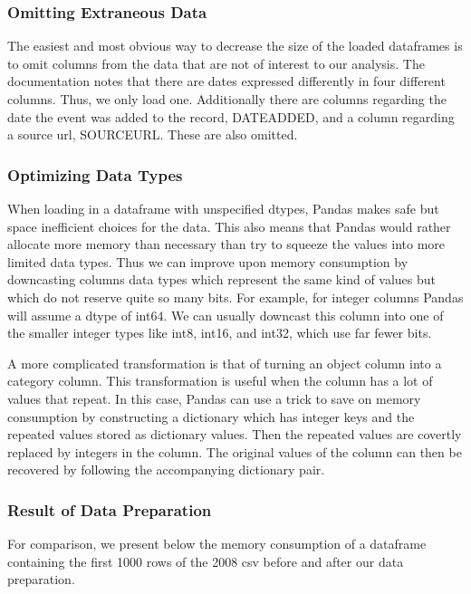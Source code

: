 \documentclass[11pt]{article}
\begin{document}
    \subsubsection{Omitting Extraneous Data}\label{omitting-extraneous-data}

    The easiest and most obvious way to decrease the size of the loaded
dataframes is to omit columns from the data that are not of interest to
our analysis. The documentation notes that there are dates expressed
differently in four different columns. Thus, we only load one.
Additionally there are columns regarding the date the event was added to
the record, DATEADDED, and a column regarding a source url, SOURCEURL.
These are also omitted.

    \subsubsection{Optimizing Data Types}\label{optimizing-data-types}

    When loading in a dataframe with unspecified dtypes, Pandas makes safe
but space inefficient choices for the data. This also means that Pandas
would rather allocate more memory than necessary than try to squeeze the
values into more limited data types. Thus we can improve upon memory
consumption by downcasting columns data types which represent the same
kind of values but which do not reserve quite so many bits. For example,
for integer columns Pandas will assume a dtype of int64. We can usually
downcast this column into one of the smaller integer types like int8,
int16, and int32, which use far fewer bits.

A more complicated transformation is that of turning an object column
into a category column. This transformation is useful when the column
has a lot of values that repeat. In this case, Pandas can use a trick to
save on memory consumption by constructing a dictionary which has
integer keys and the repeated values stored as dictionary values. Then
the repeated values are covertly replaced by integers in the column. The
original values of the column can then be recovered by following the
accompanying dictionary pair.

    \subsubsection{Result of Data
Preparation}\label{result-of-data-preparation}

    For comparison, we present below the memory consumption of a dataframe
containing the first 1000 rows of the 2008 csv before and after our data
preparation.
\end{document}

